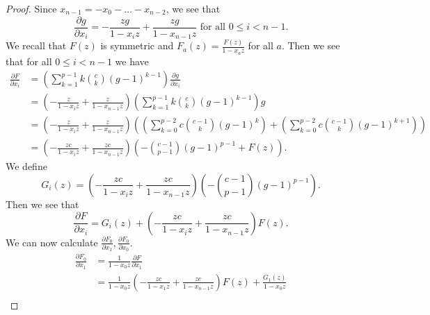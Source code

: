 \documentclass{amsart}
\numberwithin{equation}{section}
\theoremstyle{definition}
\begin{document}
\begin{proof}
Since $x_{n-1}=-x_0-\dots-x_{n-2}$, we see that
\[
\frac{\partial g}{\partial x_i}=-\frac{zg}{1-x_iz}+\frac{zg}{1-x_{n-1}z} \text{ for all $0 \le i < n-1$}.
\]
We recall that $F(z)$ is symmetric and $F_a(z)=\frac{F(z)}{1-x_az}$ for all $a$. Then we see that for all $0 \le i < n-1$ we have 
\begin{align*}
\frac{\partial F}{\partial x_i}%
&=\left(\sum_{k=1}^{p-1}k\binom{c}{k}(g-1)^{k-1}\right)\frac{\partial g}{\partial x_i}\\
&=\left(-\frac{z}{1-x_iz}+\frac{z}{1-x_{n-1}z}\right)\left(\sum_{k=1}^{p-1}k\binom{c}{k}(g-1)^{k-1}\right)g\\
&=\left(-\frac{z}{1-x_iz}+\frac{z}{1-x_{n-1}z}\right)\left(\left(\sum_{k=0}^{p-2}c\binom{c-1}{k}(g-1)^{k}\right)+\left(\sum_{k=0}^{p-2}c\binom{c-1}{k}(g-1)^{k+1}\right)\right)\\
&=\left(-\frac{zc}{1-x_iz}+\frac{zc}{1-x_{n-1}z}\right)\left(-\binom{c-1}{p-1}(g-1)^{p-1}+F(z)\right).
\end{align*}
We define
\[
G_i(z)=\left(-\frac{zc}{1-x_iz}+\frac{zc}{1-x_{n-1}z}\right)\left(-\binom{c-1}{p-1}(g-1)^{p-1}\right).
\]
Then we see that 
\[
\frac{\partial F}{\partial x_i}=G_i(z)+\left(-\frac{zc}{1-x_iz}+\frac{zc}{1-x_{n-1}z}\right)F(z).
\]
We can now calculate $\frac{\partial F_0}{\partial x_1},\frac{\partial F_0}{\partial x_0}$. 
\begin{align*}
\frac{\partial F_0}{\partial x_1}%
&=\frac{1}{1-x_0z}\frac{\partial F}{\partial x_1}\\
&=\frac{1}{1-x_0z}\left(-\frac{zc}{1-x_1z}+\frac{zc}{1-x_{n-1}z}\right)F(z)+\frac{G_1(z)}{1-x_0z}\\

\end{align*}
\end{proof}
\end{document}
